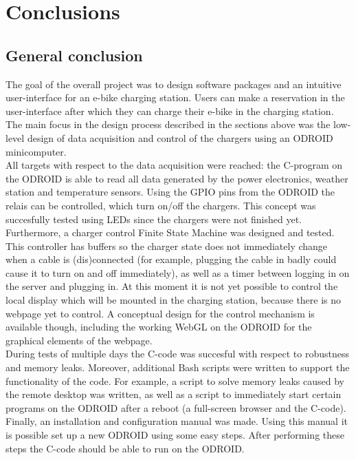 \section{Conclusions}\label{sec:conclusions}
\subsection{General conclusion}
The goal of the overall project was to design software packages and an intuitive user-interface for an e-bike charging station. Users can make a reservation in the user-interface after which they can charge their e-bike in the charging station. The main focus in the design process described in the sections above was the low-level design of data acquisition and control of the chargers using an ODROID minicomputer.\\

All targets with respect to the data acquisition were reached: the C-program on the ODROID is able to read all data generated by the power electronics, weather station and temperature sensors. Using the GPIO pins from the ODROID the relais can be controlled, which turn on/off the chargers. This concept was succesfully tested using LEDs since the chargers were not finished yet. Furthermore, a charger control Finite State Machine was designed and tested. This controller has buffers so the charger state does not immediately change when a cable is (dis)connected (for example, plugging the cable in badly could cause it to turn on and off immediately), as well as a timer between logging in on the server and plugging in. At this moment it is not yet possible to control the local display which will be mounted in the charging station, because there is no webpage yet to control. A conceptual design for the control mechanism is available though, including the working WebGL on the ODROID for the graphical elements of the webpage.\\

During tests of multiple days the C-code was succesful with respect to robustness and memory leaks. Moreover, additional Bash scripts were written to support the functionality of the code. For example, a script to solve memory leaks caused by the remote desktop was written, as well as a script to immediately start certain programs on the ODROID after a reboot (a full-screen browser and the C-code). Finally, an installation and configuration manual was made. Using this manual it is possible set up a new ODROID using some easy steps. After performing these steps the C-code should be able to run on the ODROID.\\
